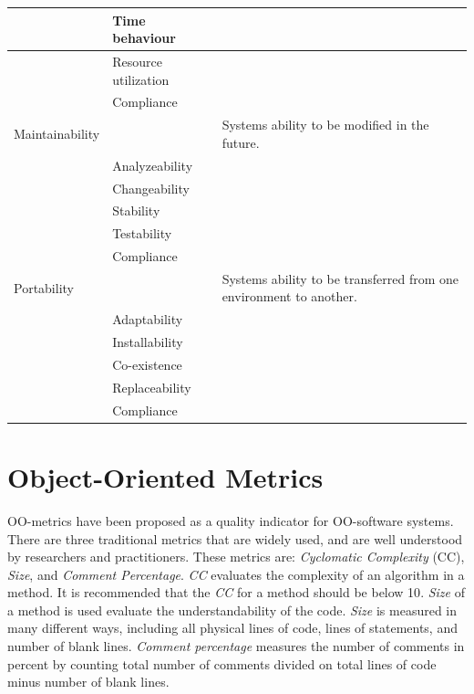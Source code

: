 \begin{table}[ht!]
{\begin{tabular}{|l|p{3cm}|p{5cm}|}
    ~                  & Time behaviour       & ~           \\ \hline
    ~                  & Resource utilization & ~           \\ \hline
    ~                  & Compliance       	  & ~           \\ \hline
    Maintainability    & ~                    & Systems ability to be modified in the future.           \\ \hline
    ~                  & Analyzeability       & ~           \\ \hline
    ~                  & Changeability        & ~           \\ \hline
    ~                  & Stability            & ~           \\ \hline
    ~                  & Testability          & ~           \\ \hline
    ~                  & Compliance       	  & ~           \\ \hline
    Portability        & ~                    & Systems ability to be transferred from one environment to another.          \\ \hline
    ~                  & Adaptability         & ~           \\ \hline
    ~                  & Installability       & ~           \\ \hline
    ~                  & Co-existence         & ~           \\ \hline
    ~                  & Replaceability       & ~           \\ \hline
    ~                  & Compliance       	  & ~           \\ \hline
    
    \end{tabular}}
\end{table}



\section{Object-Oriented Metrics}
\label{sec:oometrics}
OO-metrics have been proposed as a quality indicator for OO-software systems. There are three traditional metrics that are widely used, and are well understood by researchers and practitioners\cite{quenelobject}. These metrics are: \textit{Cyclomatic Complexity} (CC), \textit{Size}, and \textit{Comment Percentage}. \textit{CC} evaluates the complexity of an algorithm in a method. It is recommended that the \textit{CC} for a method should be below 10\cite{quenelobject}. \textit{Size} of a method is used evaluate the understandability of the code. \textit{Size} is measured in many different ways, including all physical lines of code, lines of statements, and number of blank lines. \textit{Comment percentage} measures the number of comments in percent by counting total number of comments divided on total lines of code minus number of blank lines.

